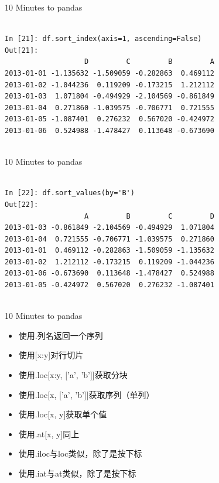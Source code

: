 \documentclass{beamer}
\begin{document}
\begin{frame}[t,fragile]{10 Minutes to pandas}


	\scriptsize
\begin{verbatim}

In [21]: df.sort_index(axis=1, ascending=False)
Out[21]: 
                   D         C         B         A
2013-01-01 -1.135632 -1.509059 -0.282863  0.469112
2013-01-02 -1.044236  0.119209 -0.173215  1.212112
2013-01-03  1.071804 -0.494929 -2.104569 -0.861849
2013-01-04  0.271860 -1.039575 -0.706771  0.721555
2013-01-05 -1.087401  0.276232  0.567020 -0.424972
2013-01-06  0.524988 -1.478427  0.113648 -0.673690


\end{verbatim}


\end{frame}



\begin{frame}[t,fragile]{10 Minutes to pandas}


	\scriptsize
\begin{verbatim}

In [22]: df.sort_values(by='B')
Out[22]: 
                   A         B         C         D
2013-01-03 -0.861849 -2.104569 -0.494929  1.071804
2013-01-04  0.721555 -0.706771 -1.039575  0.271860
2013-01-01  0.469112 -0.282863 -1.509059 -1.135632
2013-01-02  1.212112 -0.173215  0.119209 -1.044236
2013-01-06 -0.673690  0.113648 -1.478427  0.524988
2013-01-05 -0.424972  0.567020  0.276232 -1.087401


\end{verbatim}


\end{frame}


\begin{frame}[t]{10 Minutes to pandas}

	\begin{itemize}
\item 使用.列名返回一个序列
\item 使用[x:y]对行切片
\item 使用.loc[x:y, ['a', 'b']]获取分块
\item 使用.loc[x, ['a', 'b']]获取序列（单列）
\item 使用.loc[x, y]获取单个值
\item 使用.at[x, y]同上
\item 使用.iloc与loc类似，除了是按下标
\item 使用.iat与at类似，除了是按下标
	\end{itemize}

\end{frame}
\end{document}
